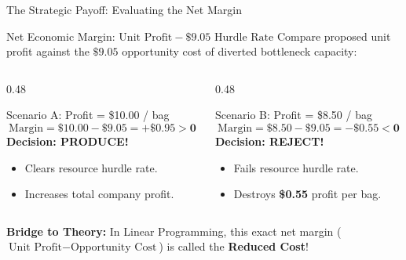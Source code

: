 \documentclass{beamer}
\begin{document}
\begin{frame}{The Strategic Payoff: Evaluating the Net Margin}
\begin{block}{Net Economic Margin: $\text{Unit Profit} - \$9.05\text{ Hurdle Rate}$}
\small
Compare proposed unit profit against the $\$9.05$ opportunity cost of diverted bottleneck capacity:
\end{block}

\vspace{-0.1em}
\begin{columns}[T]
\begin{column}{0.48\textwidth}
\begin{exampleblock}{Scenario A: Profit = \$10.00 / bag}
\small
{\footnotesize\setlength{\abovedisplayskip}{4pt}\setlength{\belowdisplayskip}{4pt}
\[ \text{Margin} = \$10.00 - \$9.05 = \mathbf{+\$0.95 > 0} \]}
\textbf{Decision: PRODUCE!}
\begin{itemize}\setlength{\itemsep}{0.1em}
  \item Clears resource hurdle rate.
  \item Increases total company profit.
\end{itemize}
\end{exampleblock}
\end{column}

\begin{column}{0.48\textwidth}
\begin{alertblock}{Scenario B: Profit = \$8.50 / bag}
\small
{\footnotesize\setlength{\abovedisplayskip}{4pt}\setlength{\belowdisplayskip}{4pt}
\[ \text{Margin} = \$8.50 - \$9.05 = \mathbf{-\$0.55 < 0} \]}
\textbf{Decision: REJECT!}
\begin{itemize}\setlength{\itemsep}{0.1em}
  \item Fails resource hurdle rate.
  \item Destroys \textbf{\$0.55} profit per bag.
\end{itemize}
\end{alertblock}
\end{column}
\end{columns}

\vspace{0.2em}
\centering \footnotesize \textbf{Bridge to Theory:} In Linear Programming, this exact net margin ($\text{Unit Profit} - \text{Opportunity Cost}$) is called the \alert{\textbf{Reduced Cost}}!
\end{frame}
\end{document}

